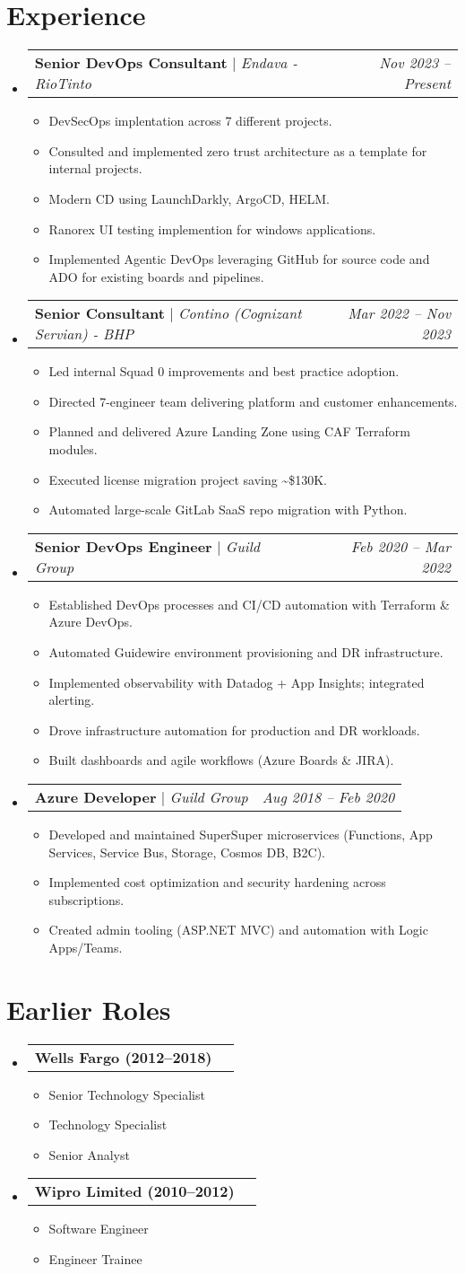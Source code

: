 \documentclass[letterpaper,10pt]{article}
\makeatletter
\newcommand{\subheadingtitlevspace}{\vspace{-3pt}}
\newcommand{\resumeItem}[1]{\item{{#1 \vspace{-4pt}}}}
\newcommand{\titleItem}[1]{\textbf{#1}}
\newcommand{\resumeProjectHeading}[2]{\item\begin{tabular*}{0.97\textwidth}{l@{\extracolsep{\fill}}r}#1 & \textit{ #2} \\\end{tabular*}\vspace{-9pt}}
\newcommand{\resumeSubHeadingListStart}{\subheadingtitlevspace\begin{itemize}[leftmargin=0.15in, label={}]}
\newcommand{\resumeSubHeadingListEnd}{\end{itemize}}
\newcommand{\resumeItemListStart}{\begin{itemize}}
\newcommand{\resumeItemListEnd}{\end{itemize}\vspace{-8pt}}
\makeatother
\begin{document}
\section{Experience}
\resumeSubHeadingListStart
\resumeProjectHeading{\titleItem{Senior DevOps Consultant} $|$ \emph{Endava - RioTinto}}{Nov 2023 -- Present}
\resumeItemListStart
\resumeItem{DevSecOps implentation across 7 different projects.}
\resumeItem{Consulted and implemented zero trust architecture as a template for internal projects.}
\resumeItem{Modern CD using LaunchDarkly, ArgoCD, HELM.}
\resumeItem{Ranorex UI testing implemention for windows applications.}
\resumeItem{Implemented Agentic DevOps leveraging GitHub for source code and ADO for existing boards and pipelines.}
\resumeItemListEnd
\resumeProjectHeading{\titleItem{Senior Consultant} $|$ \emph{Contino (Cognizant Servian) - BHP}}{Mar 2022 -- Nov 2023}
\resumeItemListStart
\resumeItem{Led internal Squad 0 improvements and best practice adoption.}
\resumeItem{Directed 7-engineer team delivering platform and customer enhancements.}
\resumeItem{Planned and delivered Azure Landing Zone using CAF Terraform modules.}
\resumeItem{Executed license migration project saving \textasciitilde{}\$130K.}
\resumeItem{Automated large-scale GitLab SaaS repo migration with Python.}
\resumeItemListEnd
\resumeProjectHeading{\titleItem{Senior DevOps Engineer} $|$ \emph{Guild Group}}{Feb 2020 -- Mar 2022}
\resumeItemListStart
\resumeItem{Established DevOps processes and CI/CD automation with Terraform \& Azure DevOps.}
\resumeItem{Automated Guidewire environment provisioning and DR infrastructure.}
\resumeItem{Implemented observability with Datadog + App Insights; integrated alerting.}
\resumeItem{Drove infrastructure automation for production and DR workloads.}
\resumeItem{Built dashboards and agile workflows (Azure Boards \& JIRA).}
\resumeItemListEnd
\resumeProjectHeading{\titleItem{Azure Developer} $|$ \emph{Guild Group}}{Aug 2018 -- Feb 2020}
\resumeItemListStart
\resumeItem{Developed and maintained SuperSuper microservices (Functions, App Services, Service Bus, Storage, Cosmos DB, B2C).}
\resumeItem{Implemented cost optimization and security hardening across subscriptions.}
\resumeItem{Created admin tooling (ASP.NET MVC) and automation with Logic Apps/Teams.}
\resumeItemListEnd
\resumeSubHeadingListEnd

\section{Earlier Roles}
\resumeSubHeadingListStart
\resumeProjectHeading{\titleItem{Wells Fargo (2012--2018)}}{}
\resumeItemListStart
\resumeItem{Senior Technology Specialist}
\resumeItem{Technology Specialist}
\resumeItem{Senior Analyst}
\resumeItemListEnd
\resumeProjectHeading{\titleItem{Wipro Limited (2010--2012)}}{}
\resumeItemListStart
\resumeItem{Software Engineer}
\resumeItem{Engineer Trainee}
\resumeItemListEnd
\resumeSubHeadingListEnd
\end{document}
